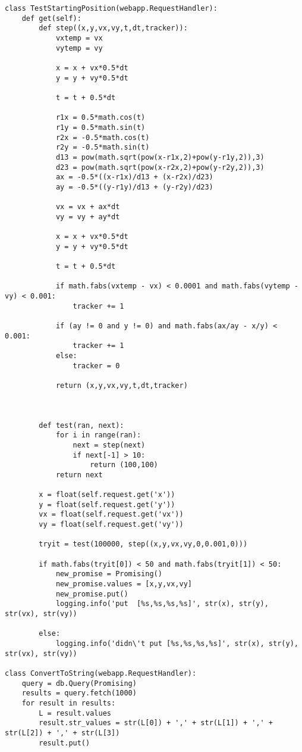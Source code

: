 \documentclass[11pt]{article}
\begin{document}
\begin{verbatim}
class TestStartingPosition(webapp.RequestHandler):
    def get(self):
        def step((x,y,vx,vy,t,dt,tracker)):
            vxtemp = vx
            vytemp = vy

            x = x + vx*0.5*dt
            y = y + vy*0.5*dt

            t = t + 0.5*dt

            r1x = 0.5*math.cos(t)
            r1y = 0.5*math.sin(t)
            r2x = -0.5*math.cos(t)
            r2y = -0.5*math.sin(t)
            d13 = pow(math.sqrt(pow(x-r1x,2)+pow(y-r1y,2)),3)
            d23 = pow(math.sqrt(pow(x-r2x,2)+pow(y-r2y,2)),3)
            ax = -0.5*((x-r1x)/d13 + (x-r2x)/d23)
            ay = -0.5*((y-r1y)/d13 + (y-r2y)/d23)

            vx = vx + ax*dt
            vy = vy + ay*dt

            x = x + vx*0.5*dt
            y = y + vy*0.5*dt

            t = t + 0.5*dt

            if math.fabs(vxtemp - vx) < 0.0001 and math.fabs(vytemp - vy) < 0.001:
                tracker += 1

            if (ay != 0 and y != 0) and math.fabs(ax/ay - x/y) < 0.001:
                tracker += 1
            else:
                tracker = 0

            return (x,y,vx,vy,t,dt,tracker)



        def test(ran, next):
            for i in range(ran):
                next = step(next)
                if next[-1] > 10:
                    return (100,100)
            return next

        x = float(self.request.get('x'))
        y = float(self.request.get('y'))
        vx = float(self.request.get('vx'))
        vy = float(self.request.get('vy'))

        tryit = test(100000, step((x,y,vx,vy,0,0.001,0)))

        if math.fabs(tryit[0]) < 50 and math.fabs(tryit[1]) < 50:
            new_promise = Promising()
            new_promise.values = [x,y,vx,vy]
            new_promise.put()
            logging.info('put  [%s,%s,%s,%s]', str(x), str(y), str(vx), str(vy))

        else:
            logging.info('didn\'t put [%s,%s,%s,%s]', str(x), str(y), str(vx), str(vy))
        
class ConvertToString(webapp.RequestHandler):
    query = db.Query(Promising)
    results = query.fetch(1000)
    for result in results:
        L = result.values
        result.str_values = str(L[0]) + ',' + str(L[1]) + ',' + str(L[2]) + ',' + str(L[3])
        result.put()
        

\end{verbatim}
\end{document}
